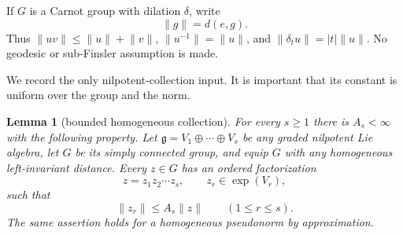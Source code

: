 \documentclass[10pt]{article}
\newtheorem{lemma}[theorem]{Lemma}
\newcommand{\norm}[1]{\lVert #1\rVert}
\begin{document}
If $G$ is a Carnot group with dilation $\delta$, write
\[
                       \norm g=d(e,g).
\]
Thus $\norm{uv}\leq\norm u+\norm v$, $\norm{u^{-1}}=\norm u$, and
$\norm{\delta_tu}=|t|\norm u$.  No geodesic or sub-Finsler assumption is made.

We record the only nilpotent-collection input.  It is important that its
constant is uniform over the group and the norm.

\begin{lemma}[bounded homogeneous collection]\label{lem:collection}
For every $s\geq1$ there is $A_s<\infty$ with the following property.  Let
$\mathfrak g=V_1\oplus\cdots\oplus V_s$ be any graded nilpotent Lie algebra,
let $G$ be its simply connected group, and equip $G$ with any homogeneous
left-invariant distance.  Every $z\in G$ has an ordered factorization
\begin{equation}\label{eq:ordered}
 z=z_1z_2\cdots z_s,\qquad z_r\in\exp(V_r),
\end{equation}
such that
\begin{equation}\label{eq:factorbound}
                         \norm{z_r}\leq A_s\norm z
                         \qquad(1\leq r\leq s).
\end{equation}
The same assertion holds for a homogeneous pseudonorm by approximation.
\end{lemma}
\end{document}
